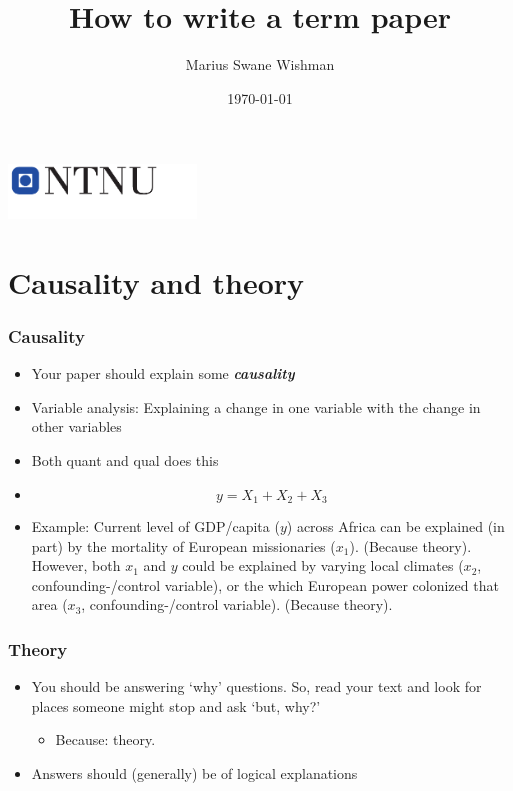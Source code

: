 \documentclass{beamer}
\title[Term paper]{How to write a term paper}
\subtitle{}
\author[Wishman]{Marius Swane Wishman}
\date{\today}
\institute{ISS}
\begin{document}
\begin{frame}[plain]
\titlepage 
\centering
\includegraphics[width=5cm]{logo_ntnu_u-slagord.pdf} 
\end{frame}

\section{Causality and theory} 

\begin{frame}
\frametitle{Causality}
	\begin{itemize}
		\item Your paper should explain some \textbf{\textit{causality}} \pause
		\item Variable analysis: Explaining a change in one variable with the 
			change in other variables
        	\item Both quant and qual does this \pause
        	\item $$y=X_1+X_2+X_3$$ \pause
		\item Example: Current level of GDP/capita ($y$) across Africa
			can be explained (in part) by the mortality of European
			missionaries ($x_1$).  (Because theory).  However, both
			$x_1$ and $y$ could be explained by varying local
			climates ($x_2$, confounding-/control variable), or the
			which European power colonized that area ($x_3$,
			confounding-/control variable). (Because theory).

	\end{itemize}
\end{frame}

\begin{frame}
\frametitle{Theory}

	\begin{itemize}
		\item You should be answering `why' questions. So, read your
			text and look for places someone might stop and ask
			`but, why?' \pause
		\begin{itemize}
		
			\item Because: theory. \pause
		
		\end{itemize}
		\item Answers should (generally) be of logical explanations 
	\end{itemize}

\end{frame}
\end{document}
